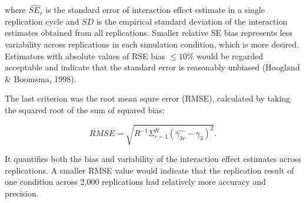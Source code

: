 \documentclass[
  man]{apa7}
\begin{document}
where \(\widehat{SE_{r}}\) is the standard error of interaction effect estimate in a single replication cycle and \(SD\) is the empirical standard deviation of the interaction estimates obtained from all replications. Smaller relative SE bias represents less variability across replications in each simulation condition, which is more desired. Estimators with absolute values of RSE bias \(\le 10\%\) would be regarded acceptable and indicate that the standard error is reasonably unbiased (Hoogland \(\&\) Boomsma, 1998).

The last criterion was the root mean squre error (RMSE), calculated by taking the squared root of the sum of squared bias:

\begin{equation}
RMSE = \sqrt{R^{-1}\Sigma^{R}_{r = 1}(\hat{\gamma_{3r}} - \gamma_{3})^2}.
\end{equation}

It quantifies both the bias and variability of the interaction effect estimates across replications. A smaller RMSE value would indicate that the replication result of one condition across 2,000 replications had relatively more accuracy and precision.
\end{document}
